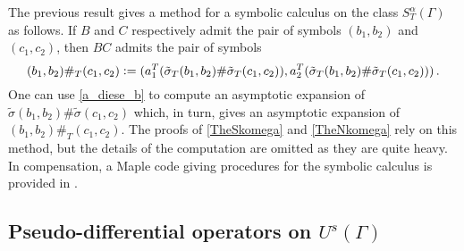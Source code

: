 \documentclass[a4paper]{article}
\begin{document}
\begin{Rem}
	\label{RemSymb}
	The previous result gives a method for a symbolic calculus on the class $S^\alpha_T(\Gamma)$ as follows. If $B$ and $C$ respectively admit the pair of symbols $(b_1,b_2)$ and $(c_1,c_2)$, then $BC$ admits the pair of symbols 
	\[(b_1,b_2) \#_T (c_1,c_2) \mathrel{\mathop:}= (a_1^T(\tilde{\sigma}_T(b_1,b_2) \# \tilde{\sigma}_T(c_1,c_2)),a_2^T(\tilde{\sigma}_T(b_1,b_2) \# \tilde{\sigma}_T(c_1,c_2)))\,.\]
	One can use \eqref{a_diese_b} to compute an asymptotic expansion of $\tilde{\sigma}(b_1,b_2) \# \tilde{\sigma}(c_1,c_2)$ which, in turn, gives an asymptotic expansion of $(b_1,b_2) \#_T (c_1,c_2)$. The proofs of \autoref{TheSkomega} and \autoref{TheNkomega} rely on this method, but the details of the computation are omitted as they are quite heavy. In compensation, a Maple code giving procedures for the symbolic calculus is provided in \cite{aversengSymbolicCalculus}.
\end{Rem}
\subsection{Pseudo-differential operators on $U^s(\Gamma)$}
\end{document}
